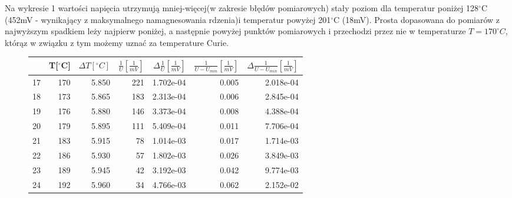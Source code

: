 \documentclass[a4paper,10pt]{article}
\begin{document}
Na wykresie 1 wartości napięcia utrzymują mniej-więcej(w zakresie błędów pomiarowych) stały poziom dla temperatur poniżej 128$^\circ$C (452mV
- wynikający z maksymalnego namagnesowania rdzenia)i temperatur powyżej 201$^\circ$C (18mV). 
Prosta dopasowana do pomiarów z najwyższym spadkiem leży najpierw
poniżej, a następnie powyżej punktów pomiarowych i przechodzi przez nie w temperaturze $T = 170^\circ C$, którąz w związku z tym możemy uznać za temperature Curie.
\begin{figure}
\begin{tabular}{lrrrrrr}
\toprule
{} &  T[$^\circ $C] &  $\Delta T [^\circ C]$ &  $\frac{1}{U}[\frac{1}{mV}]$ &  $\Delta \frac{1}{U}[\frac{1}{mV}]$ &  $\frac{1}{U-U_{min}}[\frac{1}{mV}]$ &  $\Delta \frac{1}{U-U_{min}}[\frac{1}{mV}]$ \\
\midrule
17 &            170 &                  5.850 &                          221 &                           1.702e-04 &                                0.005 &                                   2.018e-04 \\
18 &            173 &                  5.865 &                          183 &                           2.313e-04 &                                0.006 &                                   2.845e-04 \\
19 &            176 &                  5.880 &                          146 &                           3.373e-04 &                                0.008 &                                   4.388e-04 \\
20 &            179 &                  5.895 &                          111 &                           5.409e-04 &                                0.011 &                                   7.706e-04 \\
21 &            183 &                  5.915 &                           78 &                           1.014e-03 &                                0.017 &                                   1.714e-03 \\
22 &            186 &                  5.930 &                           57 &                           1.802e-03 &                                0.026 &                                   3.849e-03 \\
23 &            189 &                  5.945 &                           42 &                           3.192e-03 &                                0.042 &                                   9.774e-03 \\
24 &            192 &                  5.960 &                           34 &                           4.766e-03 &                                0.062 &                                   2.152e-02 \\

\end{tabular}
\end{figure}
\end{document}
